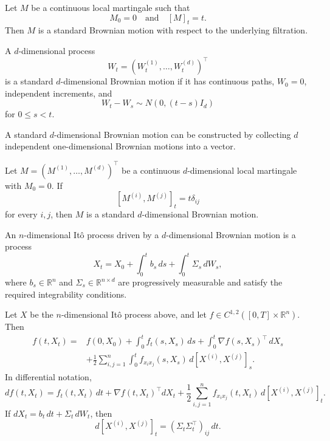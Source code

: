 \begin{thm}
Let $M$ be a continuous local martingale such that
\[
M_0=0
\quad\text{and}\quad
[M]_t=t.
\]
Then $M$ is a standard Brownian motion with respect to the underlying filtration.
\end{thm}

\begin{de}
A $d$-dimensional process
\[
W_t=(W_t^{(1)},\ldots,W_t^{(d)})^\top
\]
is a standard $d$-dimensional Brownian motion if it has continuous paths, $W_0=0$, independent increments, and
\[
W_t-W_s\sim N(0,(t-s)I_d)
\]
for $0\leq s<t$.
\end{de}

\begin{remark}
A standard $d$-dimensional Brownian motion can be constructed by collecting $d$ independent one-dimensional Brownian motions into a vector.
\end{remark}

\begin{thm}
Let $M=(M^{(1)},\ldots,M^{(d)})^\top$ be a continuous $d$-dimensional local martingale with $M_0=0$. If
\[
[M^{(i)},M^{(j)}]_t=t\delta_{ij}
\]
for every $i,j$, then $M$ is a standard $d$-dimensional Brownian motion.
\end{thm}

\begin{de}
An $n$-dimensional It\^o process driven by a $d$-dimensional Brownian motion is a process
\[
X_t
=
X_0+
\int_0^t b_s\,ds+
\int_0^t\Sigma_s\,dW_s,
\]
where $b_s\in\mathbb{R}^n$ and $\Sigma_s\in\mathbb{R}^{n\times d}$ are progressively measurable and satisfy the required integrability conditions.
\end{de}

\begin{thm}
Let $X$ be the $n$-dimensional It\^o process above, and let $f\in C^{1,2}([0,T]\times\mathbb{R}^n)$. Then
\[
\begin{aligned}
f(t,X_t)
={}&f(0,X_0)
+\int_0^t f_t(s,X_s)\,ds
+\int_0^t\nabla f(s,X_s)^\top\,dX_s\\
&+\frac12\sum_{i,j=1}^n
\int_0^t
f_{x_ix_j}(s,X_s)\,d[X^{(i)},X^{(j)}]_s.
\end{aligned}
\]
In differential notation,
\[
df(t,X_t)
=
f_t(t,X_t)\,dt
+\nabla f(t,X_t)^\top dX_t
+\frac12\sum_{i,j=1}^n
f_{x_ix_j}(t,X_t)\,d[X^{(i)},X^{(j)}]_t.
\]
If $dX_t=b_t\,dt+\Sigma_t\,dW_t$, then
\[
d[X^{(i)},X^{(j)}]_t
=(\Sigma_t\Sigma_t^\top)_{ij}\,dt.
\]
\end{thm}

